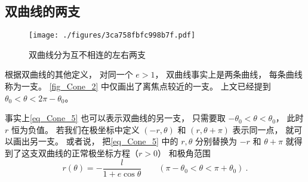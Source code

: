 \subsection{双曲线的两支}
\begin{figure}[ht]
\centering
\texttt{[image: ./figures/3ca758fbfc998b7f.pdf]}
\caption{双曲线分为互不相连的左右两支} \label{fig_Cone_3}
\end{figure}
根据双曲线的其他定义， 对同一个 $e>1$， 双曲线事实上是两条曲线， 每条曲线称为一支。 \autoref{fig_Cone_2} 中仅画出了离焦点较近的一支。 上文已经提到 $\theta_0< \theta < 2\pi-\theta_0$。

事实上\autoref{eq_Cone_5} 也可以表示双曲线的另一支， 只需要取 $-\theta_0< \theta < \theta_0$， 此时 $r$ 恒为负值。 若我们在极坐标中定义 $(-r, \theta)$ 和 $(r, \theta + \pi)$ 表示同一点， 就可以画出另一支。 或者说， 把\autoref{eq_Cone_5} 中的  $r,\theta$ 分别替换为 $-r$ 和 $\theta+\pi$ 就得到了这支双曲线的正常极坐标方程（$r > 0$） 和极角范围
\begin{equation}\label{eq_Cone_6}
r(\theta) = -\frac{l}{1 + e\cos\theta} \qquad (\pi - \theta_0<\theta < \pi + \theta_0)~.
\end{equation}

